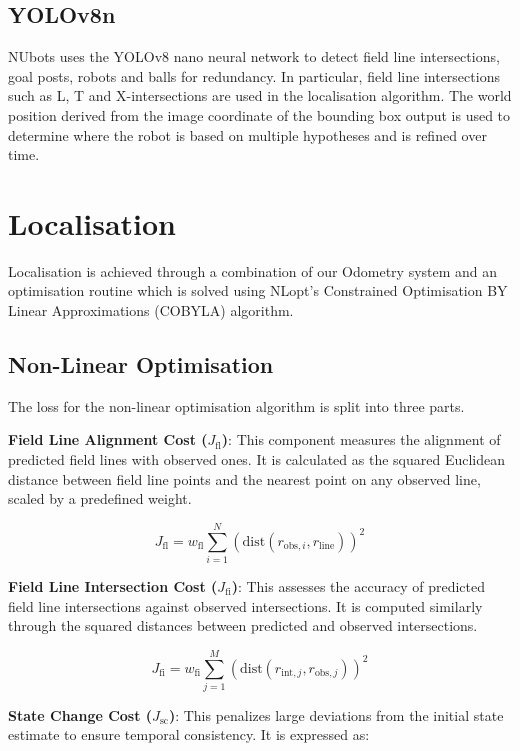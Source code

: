 \documentclass{llncs}
\begin{document}
\subsection{YOLOv8n}
NUbots uses the YOLOv8 nano \cite{YOLOv8} neural network to detect field line intersections, goal posts, robots and balls for redundancy. In particular, field line intersections such as L, T and X-intersections are used in the localisation algorithm. The world position derived from the image coordinate of the bounding box output is used to determine where the robot is based on multiple hypotheses and is refined over time.

\section{Localisation}


Localisation is achieved through a combination of our Odometry system and an optimisation routine which is solved using NLopt's\cite{nlopt} Constrained Optimisation BY Linear Approximations (COBYLA) algorithm. 

\subsection{Non-Linear Optimisation}

The loss for the non-linear optimisation algorithm is split into three parts.

\textbf{Field Line Alignment Cost ($J_{\text{fl}}$)}:
This component measures the alignment of predicted field lines with observed ones. It is calculated as the squared Euclidean distance between field line points and the nearest point on any observed line, scaled by a predefined weight.

\[
J_{\text{fl}} = w_{\text{fl}} \sum_{i=1}^{N} \left( \text{dist}(r_{\text{obs},i}, r_{\text{line}}) \right)^2
\]

 \textbf{Field Line Intersection Cost ($J_{\text{fi}}$)}:
 This assesses the accuracy of predicted field line intersections against observed intersections. It is computed similarly through the squared distances between predicted and observed intersections.

\[
J_{\text{fi}} = w_{\text{fi}} \sum_{j=1}^{M} \left( \text{dist}(r_{\text{int},j}, r_{\text{obs},j}) \right)^2
\]

\textbf{State Change Cost ($J_{\text{sc}}$)}:
This penalizes large deviations from the initial state estimate to ensure temporal consistency. It is expressed as: 
\end{document}
